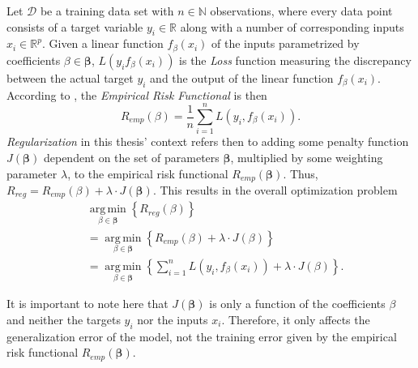 \documentclass[12pt,a4paper]{article}
\DeclareMathOperator*{\argmin}{arg\,min}
\begin{document}
Let $\mathcal{D}$ be a training data set with $n \in \mathbb{N}$ observations, where every data point consists of a target variable $y_i \in \mathbb{R}$ along with a number of corresponding inputs $x_i \in \mathbb{R}^p$. Given a linear function $f_\beta(x_i)$ of the inputs parametrized by coefficients $\beta \in \boldsymbol{\beta}$, $L(y_i f_\beta(x_i))$ is the \textit{Loss} function measuring the discrepancy between the actual target $y_i$ and the output of the linear function $f_\beta(x_i)$. According to \textcite{Vapnik1991}, the \textit{Empirical Risk Functional} is then 
\[
R_{emp}(\beta) = \frac{1}{n} \sum_{i=1}^n L(y_i, f_\beta(x_i)).
\]
\textit{Regularization} in this thesis' context refers then to adding some penalty function $J(\mathbf{\beta})$ dependent on the set of parameters $\mathbf{\beta}$, multiplied by some weighting parameter $\lambda$, to the empirical risk functional $R_{emp}(\mathbf{\beta})$. Thus, $R_{reg} = R_{emp}(\beta) + \lambda\cdot J(\mathbf{\beta})$. This results in the overall optimization problem
\begin{align}
&\underset{\beta \in \boldsymbol{\beta}}{\argmin}\left\{R_{reg}(\beta)\right\}\nonumber\\
&=\underset{\beta \in \boldsymbol{\beta}}{\argmin}\left\{R_{emp}(\beta) + \lambda\cdot J(\beta)\right\}\nonumber\\
&=\underset{\beta \in \boldsymbol{\beta}}{\argmin}\left\{\sum_{i=1}^n L(y_i, f_\beta(x_i)) + \lambda\cdot J(\beta)\right\}.\label{eq:genreg}
\end{align}

It is important to note here that $J(\mathbf{\beta})$ is only a function of the coefficients $\beta$ and neither the targets $y_i$ nor the inputs $x_i$. Therefore, it only affects the generalization error of the model, not the training error given by the empirical risk functional $R_{emp}(\mathbf{\beta})$.
\end{document}
